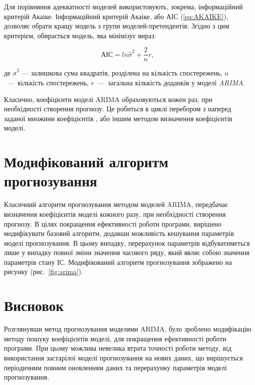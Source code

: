 \documentclass{thesis_utf8}
\begin{document}
Для порівняння адекватності моделей використовують, зокрема, інформаційний критерій Акаіке.
Інформаційний критерій Акаіке, або АІС (\ref{eq:AKAIKE}), дозволяє обрати кращу модель з групи моделей-претендентів. Згідно з цим критерієм, обирається модель, яка мінімізує вираз:

\begin{equation}
    \label{eq:AKAIKE}
    АІС = ln\hat{\sigma}^{2} + \frac{2}{n}r,
\end{equation}

де $\hat{\sigma}^{2}$ --- залишкова сума квадратів, розділена на кількість спостережень,
$n$~---~кількість спостережень,
$r$~---~загальна кількість доданків у моделі \textit{ARIMA}.

Класично, коефіцієнти моделі ARIMA обраховуються кожен раз, при необхідності створення прогнозу. Це робиться в циклі перебором з наперед заданої множини коефіцієнтів \cite{buisenesprog}, або іншим методом визначення коефіцієнтів моделі.

\section{Модифікований алгоритм прогнозування}
\label{section:arima}
Класичний алгоритм прогнозування методом моделей ARIMA, передбачає визначення коефіцієнтів моделі кожного разу, при необхідності створення прогнозу. В цілях покращення ефективності роботи програми, вирішено модифікувати базовий алгоритм, додавши можливість кешування параметрів моделі прогнозування. В цьому випадку, перерахунок параметрів відбуватиметься лише у випадку повної зміни значення часового ряду, який являє собою значення параметрів стану ІС. Модифікований алгоритм прогнозування зображено на рисунку (рис.~\ref{fig:arima}).


\section{Висновок}

Розглянувши метод прогнозування моделями ARIMA, було зроблено модифікацію методу пошуку коефіцієнтів моделі, для покращення ефективності роботи програми. При цьому можлива невелика втрата точності роботи методу, від використання застарілої моделі прогнозування на нових даних, що вирішується періодичним повним оновленням даних та перерахунку параметрів моделі прогнозування.
\end{document}
